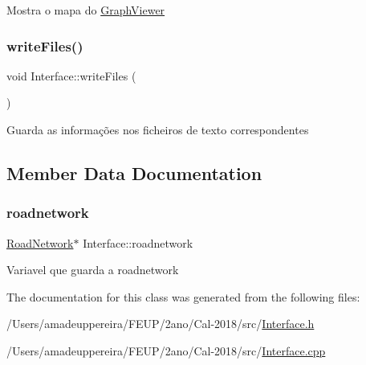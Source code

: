 Mostra o mapa do \mbox{\hyperlink{class_graph_viewer}{Graph\+Viewer}} \mbox{\label{class_interface_afa0a2e9fbced7c9451e2a3cddcd39d6a}} 
\subsubsection{\texorpdfstring{write\+Files()}{writeFiles()}}
{\footnotesize\ttfamily void Interface\+::write\+Files (\begin{DoxyParamCaption}{ }\end{DoxyParamCaption})}

Guarda as informações nos ficheiros de texto correspondentes 

\subsection{Member Data Documentation}
\mbox{\label{class_interface_aae76b1bb86e685e441c21f5f5b68ef99}} 
\subsubsection{\texorpdfstring{roadnetwork}{roadnetwork}}
{\footnotesize\ttfamily \mbox{\hyperlink{class_road_network}{Road\+Network}}$\ast$ Interface\+::roadnetwork\hspace{0.3cm}{\ttfamily [private]}}

Variavel que guarda a roadnetwork 

The documentation for this class was generated from the following files\+:\begin{DoxyCompactItemize}
\item 
/\+Users/amadeuppereira/\+F\+E\+U\+P/2ano/\+Cal-\/2018/src/\mbox{\hyperlink{_interface_8h}{Interface.\+h}}\item 
/\+Users/amadeuppereira/\+F\+E\+U\+P/2ano/\+Cal-\/2018/src/\mbox{\hyperlink{_interface_8cpp}{Interface.\+cpp}}\end{DoxyCompactItemize}
